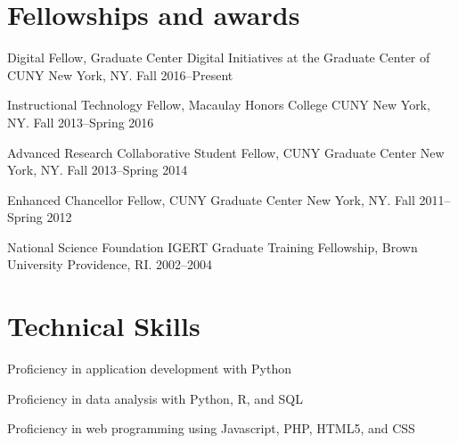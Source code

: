 \documentclass[letterpaper]{article}
\renewenvironment{itemize}{
  \begin{list}{}{
    \setlength{\leftmargin}{1.5em}
  }
}{
  \end{list}
}
\begin{document}
\section*{Fellowships and awards}
\begin{itemize}
  \item Digital Fellow, Graduate Center Digital Initiatives at the Graduate Center of CUNY New York, NY. Fall 2016--Present
  \item Instructional Technology Fellow, Macaulay Honors College CUNY New York, NY. Fall 2013--Spring 2016
  \item Advanced Research Collaborative Student Fellow, CUNY Graduate Center New York, NY. Fall 2013--Spring 2014
  \item Enhanced Chancellor Fellow, CUNY Graduate Center New York, NY. Fall 2011--Spring 2012
  \item National Science Foundation IGERT Graduate Training Fellowship, Brown University Providence, RI. 2002--2004
\end{itemize}

\section*{Technical Skills}

\begin{itemize}
    \item Proficiency in application development with Python
    \item Proficiency in data analysis with Python, R, and SQL
    \item Proficiency in web programming using Javascript, PHP, HTML5, and CSS
\end{itemize}
\end{document}
